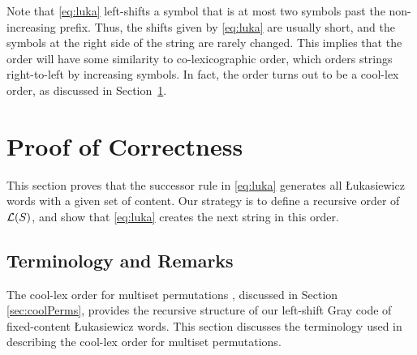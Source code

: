 Note that \eqref{eq:luka} left-shifts a symbol that is at most two symbols past the non-increasing prefix. %
Thus, the shifts given by \eqref{eq:luka} are usually short, and the symbols at the right side of the string are rarely changed.
This implies that the order will have some similarity to co-lexicographic order, which orders strings right-to-left by increasing symbols. 
In fact, the order turns out to be a cool-lex order, as discussed in Section~\ref{sec:lukaproof}.

\section{Proof of Correctness}\label{sec:lukaproof}


This section proves that the successor rule in \eqref{eq:luka} generates all Łukasiewicz words with a given set of content.
Our strategy is to define a recursive order of $\mathcal{L}(S)$, and show that \eqref{eq:luka} creates the next string in this order.

\subsection{Terminology and Remarks}
\label{sec:proof_cool}

The cool-lex order for multiset permutations \cite{CoolSODA}, discussed in Section \ref{sec:coolPerms}, provides the recursive structure of our left-shift Gray code of fixed-content Łukasiewicz words. This section discusses the terminology used in describing the cool-lex order for multiset permutations.

